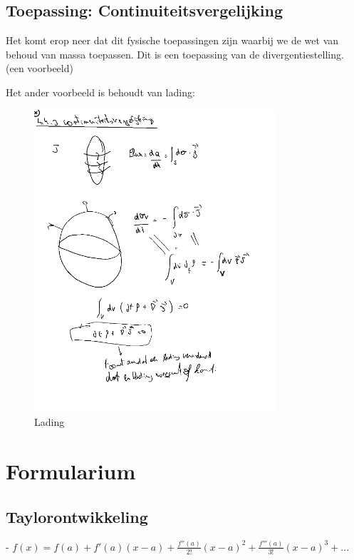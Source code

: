 \documentclass[a4paper]{article}
\begin{document}
\subsection{Toepassing: Continuiteitsvergelijking}

Het komt erop neer dat dit fysische toepassingen zijn waarbij we de wet van behoud van massa toepassen. Dit is een toepassing van de divergentiestelling. (een voorbeeld)

Het ander voorbeeld is behoudt van lading:

\begin{figure}[H]
	\centering
	\includegraphics[width=0.8\textwidth]{assets/lading.png}
	\caption{Lading}
	\label{fig:lading}
\end{figure}


\section*{Formularium}

\subsection*{Taylorontwikkeling}

- $ f(x) = f(a) + f'(a)(x-a) + \frac{f''(a)}{2!}(x-a)^2 + \frac{f'''(a)}{3!}(x-a)^3 + ... $
\end{document}
